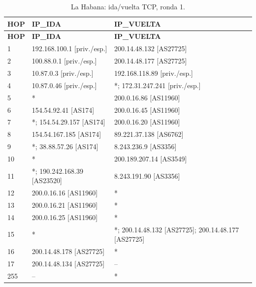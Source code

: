 \begin{longtable}{p{0.95cm}p{7.075cm}p{7.075cm}}
\caption{La Habana: ida/vuelta TCP, ronda 1.}\label{anexo:vuelta:200.14.48.134:TCP:1} \\
\toprule
\textbf{HOP} & \textbf{IP\_\allowbreak{}IDA} & \textbf{IP\_\allowbreak{}VUELTA} \\ \midrule
\endfirsthead
\toprule
\textbf{HOP} & \textbf{IP\_\allowbreak{}IDA} & \textbf{IP\_\allowbreak{}VUELTA} \\ \midrule
\endhead
1 & 192.168.100.1 [priv./esp.] & 200.14.48.132 [AS27725] \\
2 & 100.88.0.1 [priv./esp.] & 200.14.48.177 [AS27725] \\
3 & 10.87.0.3 [priv./esp.] & 192.168.118.89 [priv./esp.] \\
4 & 10.87.0.46 [priv./esp.] & *; 172.31.247.241 [priv./esp.] \\
5 & * & 200.0.16.86 [AS11960] \\
6 & 154.54.92.41 [AS174] & 200.0.16.45 [AS11960] \\
7 & *; 154.54.29.157 [AS174] & 200.0.16.20 [AS11960] \\
8 & 154.54.167.185 [AS174] & 89.221.37.138 [AS6762] \\
9 & *; 38.88.57.26 [AS174] & 8.243.236.9 [AS3356] \\
10 & * & 200.189.207.14 [AS3549] \\
11 & *; 190.242.168.39 [AS23520] & 8.243.191.90 [AS3356] \\
12 & 200.0.16.16 [AS11960] & * \\
13 & 200.0.16.21 [AS11960] & * \\
14 & 200.0.16.25 [AS11960] & * \\
15 & * & *; 200.14.48.132 [AS27725]; 200.14.48.177 [AS27725] \\
16 & 200.14.48.178 [AS27725] & * \\
17 & 200.14.48.134 [AS27725] & -- \\
255 & -- & * \\
\bottomrule
\end{longtable}
\endgroup
\begingroup
\fontsize{8}{10}\selectfont
